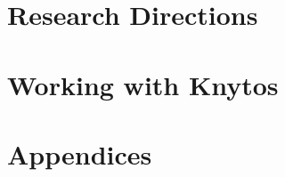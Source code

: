 \documentclass{techdoc}
\begin{document}
    
    \newpage

    
    \newpage

    
    \newpage

    
    \newpage

    
    \newpage

    


    \part{Research Directions}

    
    \newpage

    
    \newpage


    \part{Working with Knytos}

    
    \newpage

    
    \newpage

    
    \newpage

    
    \newpage


    \part{Appendices}
    
    \appendix

    
    \newpage

    
    \newpage

    
    \newpage

    
    \newpage

    

    
\end{document}

